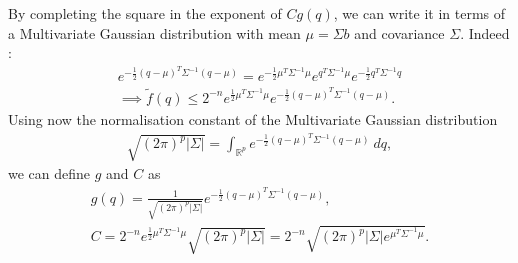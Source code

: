 \documentclass[a4paper, 12pt,oneside]{article}
\begin{document}
		By completing the square in the exponent of $Cg(q)$, we can write it in terms of a Multivariate Gaussian distribution with mean $\mu=\Sigma b$ and covariance $\Sigma$. Indeed : 
		\begin{gather}
			e^{-\frac{1}{2}(q-\mu)^T\Sigma^{-1} (q-\mu)} =
			e^{-\frac{1}{2}\mu^T\Sigma^{-1}\mu}
			e^{q^T\Sigma^{-1}\mu}
			e^{-\frac{1}{2}q^T\Sigma^{-1} q} \\
			\implies \tilde{f}(q) \le 2^{-n}e^{\frac{1}{2}\mu^T\Sigma^{-1} \mu}e^{-\frac{1}{2}(q-\mu)^T\Sigma^{-1}(q-\mu)}.
		\end{gather}
		Using now the normalisation constant of the Multivariate Gaussian distribution 
		\begin{gather}
			\sqrt{(2\pi)^p|\Sigma|}=\int_{\mathbb{R}^p}e^{-\frac{1}{2}(q-\mu)^T\Sigma^{-1}(q-\mu)}\ dq,
		\end{gather} 
		we can define $g$ and $C$ as 
		\begin{gather}
			g(q)=\frac{1}{\sqrt{(2\pi)^p|\Sigma|}}e^{-\frac{1}{2}(q-\mu)^T\Sigma^{-1}(q-\mu)}, \\
			C = 2^{-n}e^{\frac{1}{2}\mu^T\Sigma^{-1} \mu}{\sqrt{(2\pi)^p|\Sigma|}} = 2^{-n}\sqrt{(2\pi)^p|\Sigma|e^{\mu^T\Sigma^{-1} \mu}}.
		\end{gather} 
\end{document}
